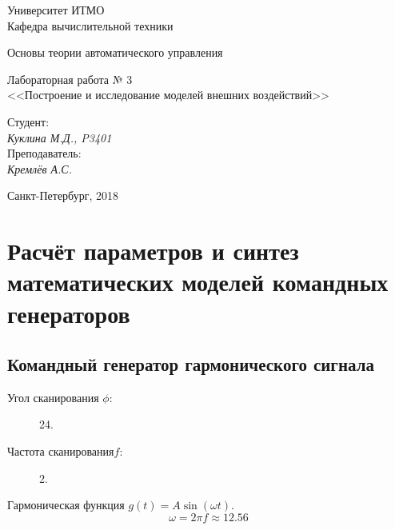 \documentclass[12pt, a4paper] {ncc}
\begin{document}
\setcounter{figure}{0}
\frenchspacing
\pagestyle{empty}
\begin{center}
                            Университет ИТМО    \\
                        Кафедра вычислительной техники

			Основы теории автоматического управления
\end{center}
\begin{center}
			Лабораторная работа № 3 \\
    <<Построение и исследование моделей внешних воздействий>>
\end{center}
\begin{flushright}
                                    Студент:\\
                                    {\it Куклина М.Д., P3401}\\
                                    Преподаватель: \\
                                    {\it Кремлёв А.С.}
\end{flushright}
\begin{center}
                             Санкт-Петербург, 2018
\end{center}
\newpage

\section{Расчёт параметров и синтез математических моделей командных генераторов}

	\subsection{Командный генератор гармонического сигнала}

		\begin{description}
    		\item[Угол сканирования $\phi$:] 24.
    		\item[Частота сканирования$f$:]  2.
		\end{description}

		Гармоническая функция $g(t) = A\sin (\omega t)$. \\

		\[\omega = 2 \pi f \approx 12.56\]
\end{document}

